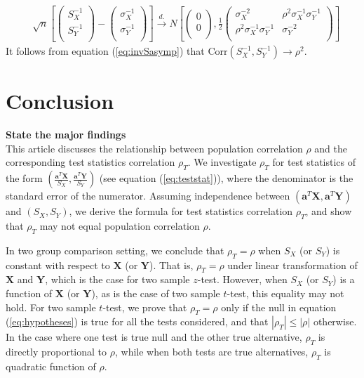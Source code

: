 \documentclass[12pt, a4paper]{article}
\newcommand{\cor}{\text{Corr}}
\begin{document}
		\begin{equation}\label{eq:invSasymp}
		\begin{aligned}
		& \sqrt{n}\left[\left( \begin{array}{c}
		S_X^{-1}\\
		S_Y^{-1}\\
		\end{array}\right)
		-
		\left( \begin{array}{c}
		\sigma_X^{-1}\\
		\sigma_Y^{-1}\\
		\end{array}\right)
		\right]
		\stackrel{d.}{\longrightarrow} 
		N\left[
		\left(\begin{array}{c}
		0\\
		0\\
		\end{array} \right), 
		\frac{1}{2}\left(
		\begin{array}{cc}
		\sigma_X^{-2} &\rho^2\sigma_X^{-1}\sigma_Y^{-1} \\
		\rho^2\sigma_X^{-1}\sigma_Y^{-1}  &\sigma_Y^{-2} \\
		\end{array}
		\right)
		\right] 
		\end{aligned}
		\end{equation}
	It follows from equation (\ref{eq:invSasymp}) that $\cor(S_X^{-1}, S_Y^{-1}) \rightarrow \rho^2$.
	
	
	
	\section{Conclusion}
	
	\textbf{State the major findings} \\
	This article discusses the relationship between population correlation $\rho$ and the 
	corresponding test statistics correlation $\rho_T$. We investigate $\rho_T$ for test statistics 
	of the form $(\frac{\bm a^T\bm X}{S_X}, \frac{\bm a^T\bm Y}{S_Y})$ (see equation 
	(\ref{eq:teststat})), where the denominator is the standard error of the numerator. Assuming 
	independence between $(\bm a^T\bm X, \bm a^T\bm Y)$ and $(S_X, S_Y)$, we derive the formula for 
	test statistics correlation $\rho_T$, and show that $\rho_T$ may not equal population 
	correlation $\rho$.  
	
	In two group comparison setting, we conclude that $\rho_T = \rho$ when $S_X$ (or $S_Y$) is 
	constant with respect to $\bm X$ (or $\bm Y$). That is, $\rho_T = \rho$ under linear 
	transformation of $\bm X$ and $\bm Y$, which is the case for two sample $z$-test. However, when 
	$S_X$ (or $S_Y$) is a function of $\bm X$ (or $\bm Y$), as is the case of two
	sample $t$-test, this equality may not hold. For two sample $t$-test, we prove that 
	$\rho_T=\rho$ only if the null in equation (\ref{eq:hypotheses}) is true for all the tests 
	considered, and that $|\rho_T|\leq |\rho|$ otherwise. In the case where one test is true null 
	and the other true alternative, $\rho_T$ is directly proportional to $\rho$, while when both 
	tests are true alternatives, $\rho_T$ is quadratic function of $\rho$.
	
\end{document}
